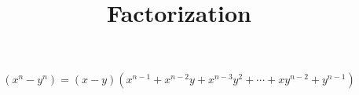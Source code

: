 \documentclass{article}
\begin{document}
\title{Factorization}
\begin{equation}
(x^n-y^n)=(x-y)(x^{n-1}+x^{n-2}y+x^{n-3}y^{2}+\cdots+xy^{n-2}+y^{n-1})
\end{equation}
\end{document}
